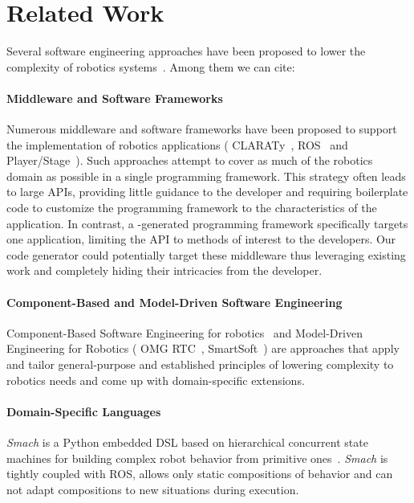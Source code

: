 
\section{Related Work}
\label{sec:related}

Several software engineering approaches have been proposed to lower
the complexity of robotics systems~\cite{Brug07a}. Among them we can cite:

\paragraph*{Middleware and Software Frameworks}

Numerous middleware and software frameworks have been proposed to
support the implementation of robotics applications (\eg{}
CLARATy~\cite{Claraty}, ROS~\cite{ROS} and
Player/Stage~\cite{Coll05a}). Such approaches attempt to cover as much
of the robotics domain as possible in a single programming framework.
This strategy often leads to large APIs, providing little guidance to
the developer and requiring boilerplate code to customize the
programming framework to the characteristics of the application. In
contrast, a \diaspec{}-generated programming framework specifically
targets one application, limiting the API to methods of interest to
the developers. Our code generator could potentially target these
middleware thus leveraging existing work and completely hiding their
intricacies from the developer.

\paragraph*{Component-Based and Model-Driven Software Engineering}

Component-Based Software Engineering for robotics~\cite{Brug07b} and
Model-Driven Engineering for Robotics (\eg{} OMG RTC~\cite{OMGRTC},
SmartSoft~\cite{Schl09a}) are approaches that apply and tailor
general-purpose and established principles of lowering complexity to
robotics needs and come up with domain-specific extensions.

\paragraph*{Domain-Specific Languages}

\emph{Smach} is a Python embedded DSL based on hierarchical concurrent
state machines for building complex robot behavior from primitive
ones~\cite{Boren10a}. \emph{Smach} is tightly coupled with ROS, allows
only static compositions of behavior and can not adapt compositions to
new situations during execution.

